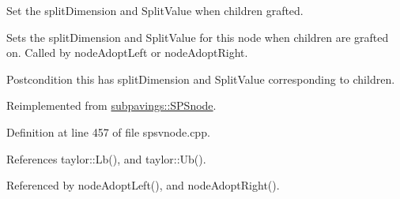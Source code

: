 \-Set the split\-Dimension and \-Split\-Value when children grafted. 

\-Sets the split\-Dimension and \-Split\-Value for this node when children are grafted on. \-Called by node\-Adopt\-Left or node\-Adopt\-Right.

\begin{DoxyPostcond}{\-Postcondition}
this has split\-Dimension and \-Split\-Value corresponding to children. 
\end{DoxyPostcond}


\-Reimplemented from \hyperlink{classsubpavings_1_1SPSnode_a785e03fc466a6a1ea851f08338f8103d}{subpavings\-::\-S\-P\-Snode}.



\-Definition at line 457 of file spsvnode.\-cpp.



\-References taylor\-::\-Lb(), and taylor\-::\-Ub().



\-Referenced by node\-Adopt\-Left(), and node\-Adopt\-Right().


